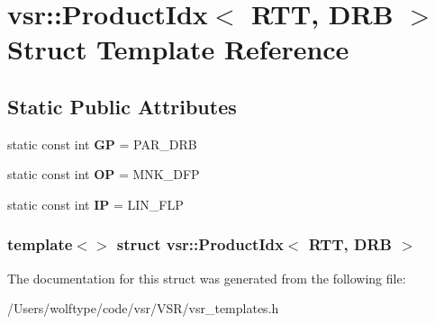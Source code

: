 \hypertarget{structvsr_1_1_product_idx_3_01_r_t_t_00_01_d_r_b_01_4}{\section{vsr\-:\-:Product\-Idx$<$ R\-T\-T, D\-R\-B $>$ Struct Template Reference}
\label{structvsr_1_1_product_idx_3_01_r_t_t_00_01_d_r_b_01_4}
}
\subsection*{Static Public Attributes}
\begin{DoxyCompactItemize}
\item 
\hypertarget{structvsr_1_1_product_idx_3_01_r_t_t_00_01_d_r_b_01_4_a0cb37df4b7be873728601f78720f894a}{static const int {\bfseries G\-P} = P\-A\-R\-\_\-\-D\-R\-B}\label{structvsr_1_1_product_idx_3_01_r_t_t_00_01_d_r_b_01_4_a0cb37df4b7be873728601f78720f894a}

\item 
\hypertarget{structvsr_1_1_product_idx_3_01_r_t_t_00_01_d_r_b_01_4_a874d30a3404e3b41504b739756602a6c}{static const int {\bfseries O\-P} = M\-N\-K\-\_\-\-D\-F\-P}\label{structvsr_1_1_product_idx_3_01_r_t_t_00_01_d_r_b_01_4_a874d30a3404e3b41504b739756602a6c}

\item 
\hypertarget{structvsr_1_1_product_idx_3_01_r_t_t_00_01_d_r_b_01_4_ab50ce30656b28c72bc766b56c969df9d}{static const int {\bfseries I\-P} = L\-I\-N\-\_\-\-F\-L\-P}\label{structvsr_1_1_product_idx_3_01_r_t_t_00_01_d_r_b_01_4_ab50ce30656b28c72bc766b56c969df9d}

\end{DoxyCompactItemize}
\subsubsection*{template$<$$>$ struct vsr\-::\-Product\-Idx$<$ R\-T\-T, D\-R\-B $>$}



The documentation for this struct was generated from the following file\-:\begin{DoxyCompactItemize}
\item 
/\-Users/wolftype/code/vsr/\-V\-S\-R/vsr\-\_\-templates.\-h\end{DoxyCompactItemize}
